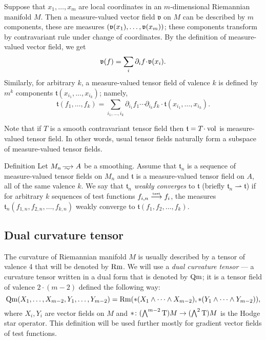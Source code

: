 Suppose that $x_1,\dots,x_m$ are local coordinates in an $m$-dimensional Riemannian manifold $M$.
Then a measure-valued vector field $\mathfrak{v}$ on $M$ can be described by $m$ components, these are measures $(\mathfrak{v}(x_1),\dots,\mathfrak{v}(x_m))$;
these components transform by contravariant rule under change of coordinates.
By the definition of measure-valued vector field, we get
\[\mathfrak{v}(f)=\sum_{i}\partial_i f\cdot \vv(x_i).\]
Similarly, for arbitrary $k$, a measure-valued tensor field of valence $k$ is defined by $m^k$ components 
$\mathfrak{t}(x_{i_1},\dots,x_{i_k})$; namely,
\[\mathfrak{t}(f_1,\dots,f_k)
=
\sum_{i_1,\dots,i_k}
\partial_{i_1} f_1 
\cdots 
\partial_{i_k} f_k
\cdot \mathfrak{t}(x_{i_1},\dots,x_{i_k}).\]

Note that if $T$ is a smooth contravariant tensor field then $\mathfrak{t}=T\cdot \vol$ is measure-valued tensor field.
In other words, usual tensor fields naturally form a subspace of measure-valued tensor fields.

\begin{rdef} {Definition}
Let $M_n\smooths{} A$ be a smoothing.
Assume that $\mathfrak{t}_n$ is a sequence of %
 measure-valued tensor fields on $M_n$  and $\mathfrak{t}$ is a
measure-valued tensor field on $A$,
all of the same valence $k$.
We say that $\mathfrak{t}_n$ \emph{weakly converges} to  $\mathfrak{t}$
(briefly $\mathfrak{t}_n\rightharpoonup\mathfrak{t}$) if for arbitrary $k$
sequences of test functions
$f_{i,n}\stackrel{\text{\tiny\rm test}}{\longrightarrow} f_i$, the measures $\mathfrak{t}_n(f_{1,n},f_{2,n},\dots,f_{k,n})$ weakly converge to $\mathfrak{t}(f_{1},f_{2},\dots,f_{k})$.
\end{rdef}

\subsection{Dual curvature tensor}

The curvature of Riemannian manifold $M$ is usually described by a tensor of valence 4 that will be denoted by $\operatorname{\rm Rm}$.
We will use a \emph{dual curvature tensor} --- 
a curvature tensor written in a dual form that is denoted by $\operatorname{\rm Qm}$;
it is a tensor field of valence $2\cdot(m-2)$ defined the following way:
\[
\operatorname{\rm Qm}(X_1,\dots,X_{m-2},Y_1,\dots,Y_{m-2})
= 
\operatorname{\rm Rm}(*(X_1\wedge\dots\wedge X_{m-2}),*(Y_1\wedge\dots\wedge Y_{m-2})),
\]
where $X_i,Y_i$ are vector fields on $M$ and  ${*}\colon(\bigwedge^{m-2}\mathrm{T})M\to(\bigwedge^2\mathrm{T})M$ is the  Hodge star operator.
This definition will be used further mostly for gradient vector fields of test functions.

